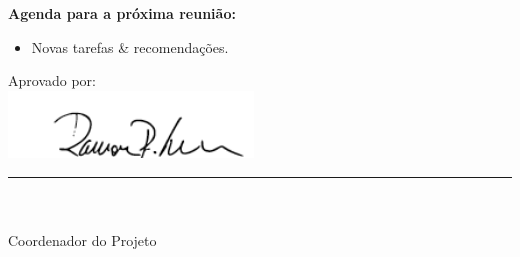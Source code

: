 \textbf{Agenda para a próxima reunião:}
  \begin{itemize}
    \item Novas tarefas \& recomendações.
  \end{itemize}


\vspace{5mm}%
\parbox[t]{70mm}{
  Aprovado por: \\[5mm]
  \centering
  \includegraphics[width=65mm]{figs/logo/assinatura-ramon.png} \\[-4mm]
  \rule[2mm]{70mm}{0.1mm} \\
  \ramon \\[1mm]
  Coordenador do Projeto \\
}

\fim